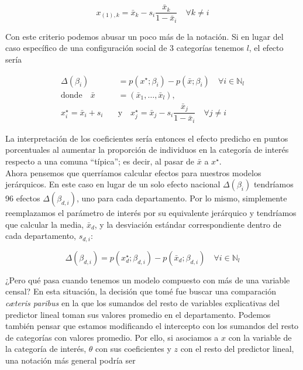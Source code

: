 \begin{equation*}
x_{(1),k}=\bar{x}_k - s_i \dfrac{\bar{x}_k}{1-\bar{x}_i} \quad \forall k \neq i
\end{equation*}

Con este criterio podemos abusar un poco más de la notación. Si en lugar del caso específico de una configuración social de 3 categorías tenemos $l$, el efecto sería 

\begin{align*}
\Delta(\beta_i) &= p(x^\star;\beta_i)-p(\bar{x};\beta_i) \quad \forall i \in \mathbb{N}_l \\
\text{donde} \quad \bar{x} &= (\bar{x}_1,\dots,\bar{x}_{l}), \\ 
x_i^\star = \bar{x}_i + s_i \quad &\text{y} \quad x_j^\star =\bar{x}_j - s_i\dfrac{\bar{x}_j}{1- \bar{x}_i} \quad \forall j \neq i 
\end{align*}

La interpretación de los coeficientes sería entonces el efecto predicho en puntos porcentuales al aumentar la proporción de individuos en la categoría de interés respecto a una comuna ``típica''; es decir, al pasar de $\bar{x}$ a $x^\star$.\\ 

Ahora pensemos que querríamos calcular efectos para nuestros modelos jerárquicos. En este caso en lugar de un solo efecto nacional $\Delta(\beta_i)$ tendríamos 96 efectos $\Delta(\beta_{d,i})$, uno para cada departamento. Por lo mismo, simplemente reemplazamos el parámetro de interés por su equivalente jerárquico y tendríamos que calcular la media, $\bar{x}_{d}$, y la desviación estándar correspondiente dentro de cada departamento, $s_{d,i}$: 

\begin{equation*}
\Delta(\beta_{d,i}) =  p(x^\star_{d};\beta_{d,i})-p(\bar{x}_{d};\beta_{d,i}) \quad \forall i \in \mathbb{N}_l
\end{equation*}

¿Pero qué pasa cuando tenemos un modelo compuesto con más de una variable censal? En esta situación, la decisión que tomé fue buscar una comparación \textit{c\ae teris paribus} en la que los sumandos del resto de variables explicativas del predictor lineal toman sus valores promedio en el departamento. Podemos también pensar que estamos modificando el intercepto con los sumandos del resto de categorías con valores promedio. Por ello, si asociamos a $x$ con la variable de la categoría de interés, $\theta$ con sus coeficientes y $z$ con el resto del predictor lineal, una notación más general podría ser

